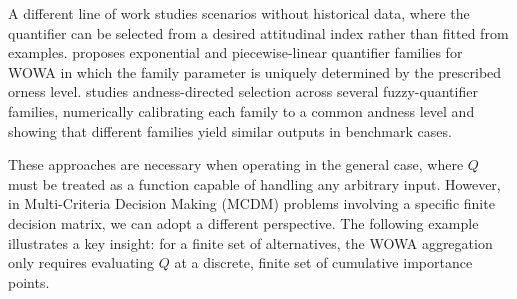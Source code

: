 A different line of work studies scenarios without historical data, where the quantifier can be selected from a desired attitudinal index rather than fitted from examples. \citet{Liu2006} proposes exponential and piecewise-linear quantifier families for WOWA in which the family parameter is uniquely determined by the prescribed orness level. \citet{DirectednessWOWA} studies andness-directed selection across several fuzzy-quantifier families, numerically calibrating each family to a common andness level and showing that different families yield similar outputs in benchmark cases.

These approaches are necessary when operating in the general case, where $Q$ must be treated as a function capable of handling any arbitrary input. However, in Multi-Criteria Decision Making (MCDM) problems involving a specific finite decision matrix, we can adopt a different perspective. The following example illustrates a key insight: for a finite set of alternatives, the WOWA aggregation only requires evaluating \(Q\) at a discrete, finite set of cumulative importance points.

